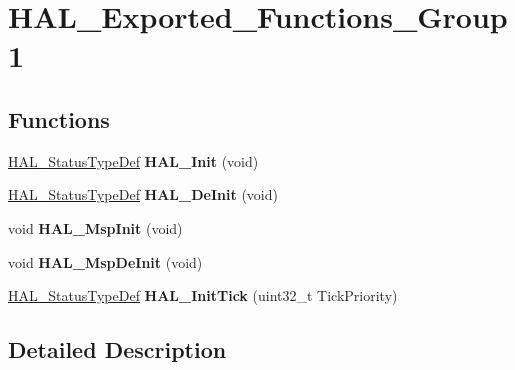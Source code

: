 \hypertarget{group___h_a_l___exported___functions___group1}{}\section{H\+A\+L\+\_\+\+Exported\+\_\+\+Functions\+\_\+\+Group1}
\label{group___h_a_l___exported___functions___group1}
\subsection*{Functions}
\begin{DoxyCompactItemize}
\item 
\hyperlink{stm32f4xx__hal__def_8h_a63c0679d1cb8b8c684fbb0632743478f}{H\+A\+L\+\_\+\+Status\+Type\+Def} {\bfseries H\+A\+L\+\_\+\+Init} (void)\hypertarget{group___h_a_l___exported___functions___group1_gaecac54d350c3730e6831eb404e557dc4}{}\label{group___h_a_l___exported___functions___group1_gaecac54d350c3730e6831eb404e557dc4}

\item 
\hyperlink{stm32f4xx__hal__def_8h_a63c0679d1cb8b8c684fbb0632743478f}{H\+A\+L\+\_\+\+Status\+Type\+Def} {\bfseries H\+A\+L\+\_\+\+De\+Init} (void)\hypertarget{group___h_a_l___exported___functions___group1_ga95911129a26afb05232caaaefa31956f}{}\label{group___h_a_l___exported___functions___group1_ga95911129a26afb05232caaaefa31956f}

\item 
void {\bfseries H\+A\+L\+\_\+\+Msp\+Init} (void)\hypertarget{group___h_a_l___exported___functions___group1_gae4fb8e66865c87d0ebab74a726a6891f}{}\label{group___h_a_l___exported___functions___group1_gae4fb8e66865c87d0ebab74a726a6891f}

\item 
void {\bfseries H\+A\+L\+\_\+\+Msp\+De\+Init} (void)\hypertarget{group___h_a_l___exported___functions___group1_gadd10d026ef02d00e32e80c9eab9db830}{}\label{group___h_a_l___exported___functions___group1_gadd10d026ef02d00e32e80c9eab9db830}

\item 
\hyperlink{stm32f4xx__hal__def_8h_a63c0679d1cb8b8c684fbb0632743478f}{H\+A\+L\+\_\+\+Status\+Type\+Def} {\bfseries H\+A\+L\+\_\+\+Init\+Tick} (uint32\+\_\+t Tick\+Priority)\hypertarget{group___h_a_l___exported___functions___group1_ga879cdb21ef051eb81ec51c18147397d5}{}\label{group___h_a_l___exported___functions___group1_ga879cdb21ef051eb81ec51c18147397d5}

\end{DoxyCompactItemize}


\subsection{Detailed Description}
